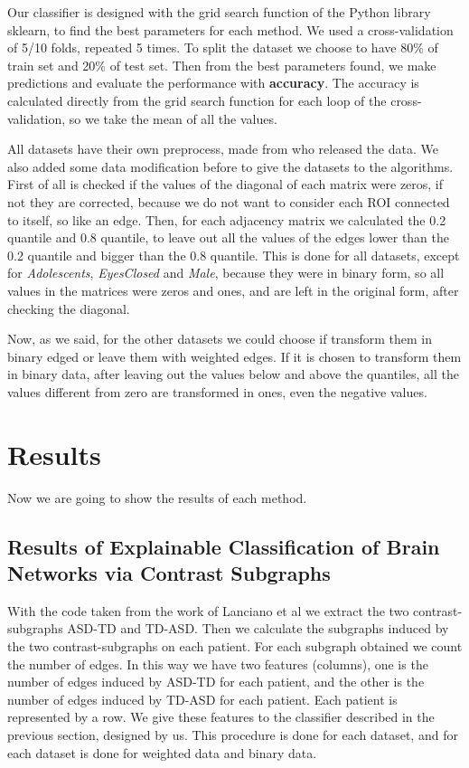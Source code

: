 Our classifier is designed with the grid search function of the Python library sklearn, to find the best parameters for each method. We used a cross-validation of 5/10 folds, repeated 5 times. To split the dataset we choose to have 80\% of train set and 20\% of test set. Then from the best parameters found, we make predictions and evaluate the performance with \textbf{accuracy}. The accuracy is calculated directly from the grid search function for each loop of the cross-validation, so we take the mean of all the values. 
\vspace{0.5cm}

All datasets have their own preprocess, made from who released the data. We also added some data modification before to give the datasets to the algorithms. First of all is checked if the values of the diagonal of each matrix were zeros, if not they are corrected, because we do not want to consider each ROI connected to itself, so like an edge. Then, for each adjacency matrix we calculated the 0.2 quantile and 0.8 quantile, to leave out all the values of the edges lower than the 0.2 quantile and bigger than the 0.8 quantile. This is done for all datasets, except for \textit{Adolescents}, \textit{EyesClosed} and \textit{Male}, because they were in binary form, so all values in the matrices were zeros and ones, and are left in the original form, after checking the diagonal. 
\vspace{0.5cm}

Now, as we said, for the other datasets we could choose if transform them in binary edged or leave them with weighted edges. If it is chosen to transform them in binary data, after leaving out the values below and above the quantiles, all the values different from zero are transformed in ones, even the negative values.


\section{Results}
Now we are going to show the results of each method.
\vspace{0.5cm}

\subsection{Results of Explainable Classification of Brain Networks via Contrast Subgraphs}

With the code taken from the work of Lanciano et al \cite{lanciano2020cs} we extract the two contrast-subgraphs ASD-TD and TD-ASD. Then we calculate the subgraphs induced by the two contrast-subgraphs on each patient. For each subgraph obtained we count the number of edges. In this way we have two features (columns), one is the number of edges induced by ASD-TD for each patient, and the other is the number of edges induced by TD-ASD for each patient. Each patient is represented by a row. We give these features to the classifier described in the previous section, designed by us. This procedure is done for each dataset, and for each dataset is done for weighted data and binary data. 
\vspace{0.5cm}

